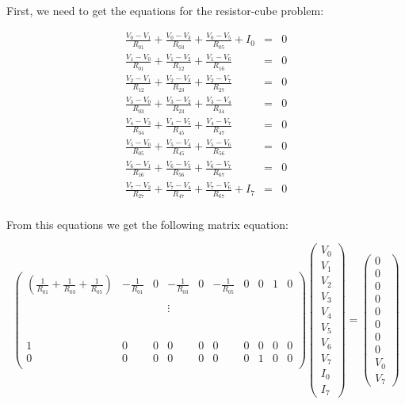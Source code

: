 \documentclass[%
]
{scrartcl}
\theoremstyle{plain}
\begin{document}
First, we need to get the equations for the resistor-cube problem:

\begin{eqnarray*}
\frac{V_{0}-V_{1}}{R_{01}}+\frac{V_{0}-V_{3}}{R_{03}}+\frac{V_{0}-V_{5}}{R_{05}}+I_{0}&=&0\\
\frac{V_{1}-V_{0}}{R_{01}}+\frac{V_{1}-V_{2}}{R_{12}}+\frac{V_{1}-V_{6}}{R_{16}}&=&0\\
\frac{V_{2}-V_{1}}{R_{12}}+\frac{V_{2}-V_{3}}{R_{23}}+\frac{V_{2}-V_{7}}{R_{27}}&=&0\\
\frac{V_{3}-V_{0}}{R_{03}}+\frac{V_{3}-V_{2}}{R_{23}}+\frac{V_{3}-V_{4}}{R_{34}}&=&0\\
\frac{V_{4}-V_{3}}{R_{34}}+\frac{V_{4}-V_{5}}{R_{45}}+\frac{V_{4}-V_{7}}{R_{47}}&=&0\\
\frac{V_{5}-V_{0}}{R_{05}}+\frac{V_{5}-V_{4}}{R_{45}}+\frac{V_{5}-V_{6}}{R_{56}}&=&0\\
\frac{V_{6}-V_{1}}{R_{16}}+\frac{V_{6}-V_{5}}{R_{56}}+\frac{V_{6}-V_{7}}{R_{67}}&=&0\\
\frac{V_{7}-V_{2}}{R_{27}}+\frac{V_{7}-V_{4}}{R_{47}}+\frac{V_{7}-V_{6}}{R_{67}}+I_{7}&=&0\\
\end{eqnarray*}

From this equations we get the following matrix equation:

\begin{equation*}
\begin{pmatrix}
(\frac{1}{R_{01}}+\frac{1}{R_{03}}+\frac{1}{R_{05}})&-\frac{1}{R_{01}}&0&-\frac{1}{R_{03}}&0&-\frac{1}{R_{05}}&0&0&1&0\\
&&&&&&&\\
&&&\vdots&&&&&&\\
&&&&&&&&&\\
&&&&&&&&&\\
&&&&&&&&&\\
&&&&&&&&&\\
&&&&&&&&&\\
1&0&0&0&0&0&0&0&0&0\\
0&0&0&0&0&0&0&1&0&0\\
\end{pmatrix}
\begin{pmatrix}V_{0}\\V_{1}\\V_{2}\\V_{3}\\V_{4}\\V_{5}\\V_{6}\\V_{7}\\I_{0}\\I_{7}\end{pmatrix}=
\begin{pmatrix}0\\0\\0\\0\\0\\0\\0\\0\\V_{0}\\V_{7}\end{pmatrix}
\end{equation*}
\end{document}
